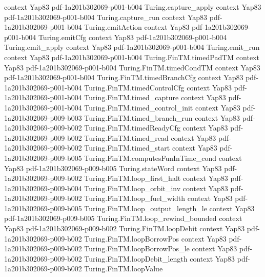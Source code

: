 \begin{theorem}
  {context}
  {Yap83}
  {pdf-1a201b302069-p001-b004}
\proofstep
  {Turing.capture_apply}
  {context}
  {Yap83}
  {pdf-1a201b302069-p001-b004}
\proofstep
  {Turing.capture_run}
  {context}
  {Yap83}
  {pdf-1a201b302069-p001-b004}
\proofstep
  {Turing.emitAction}
  {context}
  {Yap83}
  {pdf-1a201b302069-p001-b004}
\proofstep
  {Turing.emitCfg}
  {context}
  {Yap83}
  {pdf-1a201b302069-p001-b004}
\proofstep
  {Turing.emit_apply}
  {context}
  {Yap83}
  {pdf-1a201b302069-p001-b004}
\proofstep
  {Turing.emit_run}
  {context}
  {Yap83}
  {pdf-1a201b302069-p001-b004}
\proofstep
  {Turing.FinTM.timedPadTM}
  {context}
  {Yap83}
  {pdf-1a201b302069-p001-b004}
\proofstep
  {Turing.FinTM.timedCondTM}
  {context}
  {Yap83}
  {pdf-1a201b302069-p001-b004}
\proofstep
  {Turing.FinTM.timedBranchCfg}
  {context}
  {Yap83}
  {pdf-1a201b302069-p001-b004}
\proofstep
  {Turing.FinTM.timedControlCfg}
  {context}
  {Yap83}
  {pdf-1a201b302069-p001-b004}
\proofstep
  {Turing.FinTM.timed_capture}
  {context}
  {Yap83}
  {pdf-1a201b302069-p001-b004}
\proofstep
  {Turing.FinTM.timed_control_init}
  {context}
  {Yap83}
  {pdf-1a201b302069-p009-b003}
\proofstep
  {Turing.FinTM.timed_branch_run}
  {context}
  {Yap83}
  {pdf-1a201b302069-p009-b002}
\proofstep
  {Turing.FinTM.timedReadyCfg}
  {context}
  {Yap83}
  {pdf-1a201b302069-p009-b002}
\proofstep
  {Turing.FinTM.timed_read}
  {context}
  {Yap83}
  {pdf-1a201b302069-p009-b002}
\proofstep
  {Turing.FinTM.timed_start}
  {context}
  {Yap83}
  {pdf-1a201b302069-p009-b005}
\proofstep
  {Turing.FinTM.computesFunInTime_cond}
  {context}
  {Yap83}
  {pdf-1a201b302069-p009-b005}
\proofstep
  {Turing.stateWord}
  {context}
  {Yap83}
  {pdf-1a201b302069-p009-b002}
\proofstep
  {Turing.FinTM.loop_first_halt}
  {context}
  {Yap83}
  {pdf-1a201b302069-p009-b004}
\proofstep
  {Turing.FinTM.loop_orbit_inv}
  {context}
  {Yap83}
  {pdf-1a201b302069-p009-b002}
\proofstep
  {Turing.FinTM.loop_fuel_width}
  {context}
  {Yap83}
  {pdf-1a201b302069-p009-b005}
\proofstep
  {Turing.FinTM.loop_output_length_le}
  {context}
  {Yap83}
  {pdf-1a201b302069-p009-b005}
\proofstep
  {Turing.FinTM.loop_rewind_bounded}
  {context}
  {Yap83}
  {pdf-1a201b302069-p009-b002}
\proofstep
  {Turing.FinTM.loopDebit}
  {context}
  {Yap83}
  {pdf-1a201b302069-p009-b002}
\proofstep
  {Turing.FinTM.loopBorrowPos}
  {context}
  {Yap83}
  {pdf-1a201b302069-p009-b002}
\proofstep
  {Turing.FinTM.loopBorrowPos_le}
  {context}
  {Yap83}
  {pdf-1a201b302069-p009-b002}
\proofstep
  {Turing.FinTM.loopDebit_length}
  {context}
  {Yap83}
  {pdf-1a201b302069-p009-b002}
\proofstep
  {Turing.FinTM.loopValue}

\end{theorem}
